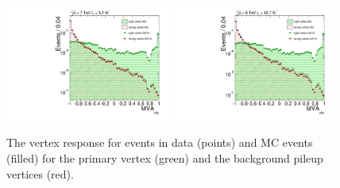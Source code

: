 \begin{figure}
  \includegraphics[width=0.48\textwidth]{analysis_comps/plots/vertex_bdt_output_7TeV_log.pdf}
  \includegraphics[width=0.48\textwidth]{analysis_comps/plots/vertex_bdt_output_8TeV_log.pdf}
  \caption[The vertex \BDT response for \Zmumu events]{The vertex \BDT response for \Zmumu events in data (points) and MC events (filled) for the primary vertex (green) and the background pileup vertices (red).}
  \label{fig:vertex_bdt_response}
\end{figure}


